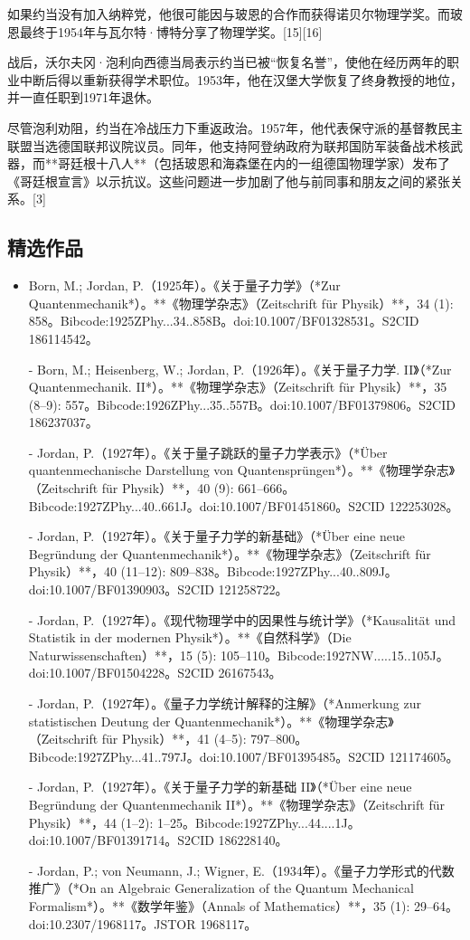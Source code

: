 如果约当没有加入纳粹党，他很可能因与玻恩的合作而获得诺贝尔物理学奖。而玻恩最终于1954年与瓦尔特·博特分享了物理学奖。[15][16]

战后，沃尔夫冈·泡利向西德当局表示约当已被“恢复名誉”，使他在经历两年的职业中断后得以重新获得学术职位。1953年，他在汉堡大学恢复了终身教授的地位，并一直任职到1971年退休。

尽管泡利劝阻，约当在冷战压力下重返政治。1957年，他代表保守派的基督教民主联盟当选德国联邦议院议员。同年，他支持阿登纳政府为联邦国防军装备战术核武器，而**哥廷根十八人**（包括玻恩和海森堡在内的一组德国物理学家）发布了《哥廷根宣言》以示抗议。这些问题进一步加剧了他与前同事和朋友之间的紧张关系。[3]
\subsection{精选作品}
\begin{itemize}
\item Born, M.; Jordan, P.（1925年）。《关于量子力学》（*Zur Quantenmechanik*）。**《物理学杂志》（Zeitschrift für Physik）**，34 (1): 858。Bibcode:1925ZPhy...34..858B。doi:10.1007/BF01328531。S2CID 186114542。

- Born, M.; Heisenberg, W.; Jordan, P.（1926年）。《关于量子力学. II》（*Zur Quantenmechanik. II*）。**《物理学杂志》（Zeitschrift für Physik）**，35 (8–9): 557。Bibcode:1926ZPhy...35..557B。doi:10.1007/BF01379806。S2CID 186237037。

- Jordan, P.（1927年）。《关于量子跳跃的量子力学表示》（*Über quantenmechanische Darstellung von Quantensprüngen*）。**《物理学杂志》（Zeitschrift für Physik）**，40 (9): 661–666。Bibcode:1927ZPhy...40..661J。doi:10.1007/BF01451860。S2CID 122253028。

- Jordan, P.（1927年）。《关于量子力学的新基础》（*Über eine neue Begründung der Quantenmechanik*）。**《物理学杂志》（Zeitschrift für Physik）**，40 (11–12): 809–838。Bibcode:1927ZPhy...40..809J。doi:10.1007/BF01390903。S2CID 121258722。

- Jordan, P.（1927年）。《现代物理学中的因果性与统计学》（*Kausalität und Statistik in der modernen Physik*）。**《自然科学》（Die Naturwissenschaften）**，15 (5): 105–110。Bibcode:1927NW.....15..105J。doi:10.1007/BF01504228。S2CID 26167543。

- Jordan, P.（1927年）。《量子力学统计解释的注解》（*Anmerkung zur statistischen Deutung der Quantenmechanik*）。**《物理学杂志》（Zeitschrift für Physik）**，41 (4–5): 797–800。Bibcode:1927ZPhy...41..797J。doi:10.1007/BF01395485。S2CID 121174605。

- Jordan, P.（1927年）。《关于量子力学的新基础 II》（*Über eine neue Begründung der Quantenmechanik II*）。**《物理学杂志》（Zeitschrift für Physik）**，44 (1–2): 1–25。Bibcode:1927ZPhy...44....1J。doi:10.1007/BF01391714。S2CID 186228140。

- Jordan, P.; von Neumann, J.; Wigner, E.（1934年）。《量子力学形式的代数推广》（*On an Algebraic Generalization of the Quantum Mechanical Formalism*）。**《数学年鉴》（Annals of Mathematics）**，35 (1): 29–64。doi:10.2307/1968117。JSTOR 1968117。
\end{itemize}